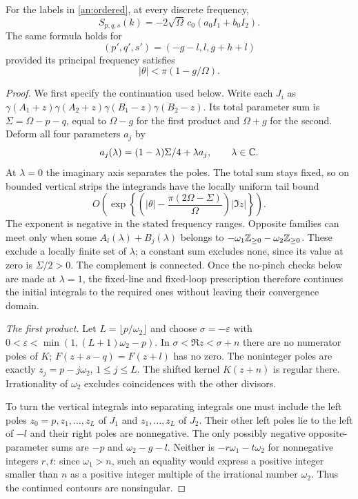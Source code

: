 \begin{lemma}\label{an:product-formula}
For the labels in \eqref{an:ordered}, at every discrete frequency,
\begin{equation}
 S_{p,q,s}(k)=-2\sqrt\Omega\,c_0(a_0I_1+b_0I_2).
 \label{an:product}
\end{equation}
The same formula holds for
\[
 (p',q',s')=(-g-l,l,g+h+l)
\]
provided its principal frequency satisfies
\begin{equation}
 |\theta|<\pi(1-g/\Omega).
 \label{an:frequency}
\end{equation}
\end{lemma}

\begin{proof}
We first specify the continuation used below.  Write each $J_i$ as
$\gamma(A_1+z)\gamma(A_2+z)\gamma(B_1-z)\gamma(B_2-z)$.
Its total parameter sum is $\Sigma=\Omega-p-q$, equal to $\Omega-g$
for the first product and $\Omega+g$ for the second.  Deform all four
parameters $a_j$ by
\[
 a_j(\lambda)=(1-\lambda)\Sigma/4+\lambda a_j,\qquad \lambda\in\mathbb C.
\]
At $\lambda=0$ the imaginary axis separates the poles.  The total sum
stays fixed, so on bounded vertical strips the integrands have the
locally uniform tail bound
\[
 O\!\left(\exp\left\{
   \left(|\theta|-\frac{\pi(2\Omega-\Sigma)}{\Omega}\right)|\Im z|
                    \right\}\right).
\]
The exponent is negative in the stated frequency ranges.  Opposite
families can meet only when some $A_i(\lambda)+B_j(\lambda)$ belongs to
$-\omega_1\mathbb Z_{\ge0}-\omega_2\mathbb Z_{\ge0}$.  These exclude a locally
finite set of $\lambda$; a constant sum excludes none, since its value
at zero is $\Sigma/2>0$.  The complement is connected.  Once the
no-pinch checks below are made at $\lambda=1$, the fixed-line and
fixed-loop prescription therefore continues the initial integrals to
the required ones without leaving their convergence domain.

\emph{The first product.}
Let $L=\lfloor p/\omega_2\rfloor$ and choose
$\sigma=-\varepsilon$ with
$0<\varepsilon<\min(1,(L+1)\omega_2-p)$.
In $\sigma<\Re z<\sigma+n$ there are no numerator poles of $K$;
$F(z+s-q)=F(z+l)$ has no zero.  The noninteger poles are exactly
$z_j=p-j\omega_2$, $1\le j\le L$.  The shifted kernel $K(z+n)$ is
regular there.  Irrationality of $\omega_2$ excludes coincidences with
the other divisors.

To turn the vertical integrals into separating integrals one must
include the left poles $z_0=p,z_1,\ldots,z_L$ of $J_1$ and
$z_1,\ldots,z_L$ of $J_2$.  Their other left poles lie to the left
of $-l$ and their right poles are nonnegative.  The only possibly
negative opposite-parameter sums are $-p$ and $\omega_2-g-l$.
Neither is $-r\omega_1-t\omega_2$ for nonnegative integers $r,t$: since $\omega_1>n$,
such an equality would express a positive integer smaller than $n$
as a positive integer multiple of the irrational number $\omega_2$.
Thus the continued contours are nonsingular.


\end{proof}
